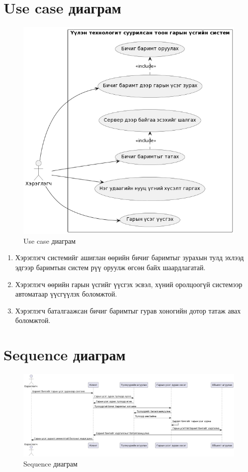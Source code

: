 \section{Use case диаграм}
\begin{figure}[h]
	\centering
	\includegraphics[scale=0.66]{assets/usecase_mn.png}
	\caption{Use case диаграм}
	\label{fig:usecasemn}
\end{figure}
\begin{enumerate}
	\item Хэрэглэгч системийг ашиглан өөрийн бичиг баримтыг зурахын тулд эхлээд эдгээр баримтын систем рүү оруулж өгсөн байх шаардлагатай.
	\item Хэрэглэгч өөрийн гарын үсгийг үүсгэх эсвэл, хүний оролцоогүй системээр автоматаар үүсгүүлэх боломжтой.
	\item Хэрэглэгч баталгаажсан бичиг баримтыг гурав хоногийн дотор татаж авах боломжтой.
\end{enumerate}
\pagebreak
\section{Sequence диаграм}
\begin{figure}[h!]
	\centering
	\includegraphics[scale=0.45, angle=90]{assets/sequence2.png}
	\caption{Sequence диаграм}
	\label{fig:usecasemn}
\end{figure}
\newpage
